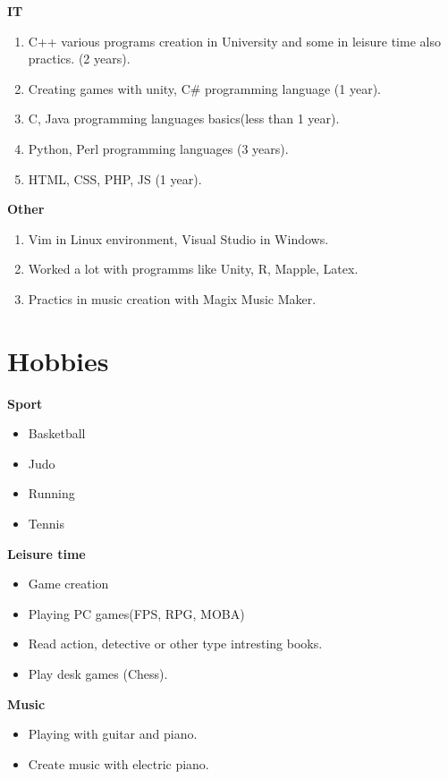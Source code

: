 \documentclass[a4paper,12pt]{article}
\begin{document}
\textbf{IT}
\begin{enumerate}
	\item C++ various programs creation in University and some in leisure time also practics. (2 years).
	
	\item Creating games with unity, C\# programming language (1 year).
	
	\item C, Java programming languages basics(less than 1 year).
	
	\item Python, Perl programming languages (3 years).
	
	\item HTML, CSS, PHP, JS (1 year).
\end{enumerate}

\textbf{Other}
\begin{enumerate}
	\item Vim in Linux environment, Visual Studio in Windows.
	\item Worked a lot with programms like Unity, R, Mapple, Latex.
	\item Practics in music creation with Magix Music Maker.
\end{enumerate}

\clearpage

\section{Hobbies}
\textbf{Sport}
\begin{itemize}
	\item Basketball
	\item Judo
	\item Running
	\item Tennis
\end{itemize}

\textbf{Leisure time}
\begin{itemize}
	\item Game creation
	\item Playing PC games(FPS, RPG, MOBA)
	\item Read action, detective or other type intresting books.
	\item Play desk games (Chess).
\end{itemize}

\textbf{Music}
\begin{itemize}
	\item Playing with guitar and piano.
	\item Create music with electric piano.
\end{itemize}
\end{document}
